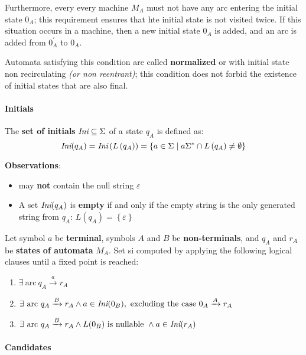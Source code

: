 \documentclass[english]{article}
\begin{document}
Furthermore, every every machine \(M_A\) must not have any arc entering the initial state \(0_A\); this requirement ensures that hte initial state is not visited twice.
If this situation occurs in a machine, then a new initial state \(0_A\) is added, and an arc is added from \(0^\prime_A\) to \(0_A\).

Automata satisfying this condition are called \textbf{normalized} or with initial state non recirculating \textit{(or non reentrant)};
this condition does not forbid the existence of initial states that are also final.

\paragraph{Initials}

The \textbf{set of initials} \(\textit{Ini} \subseteq \Sigma\) of a state \(q_A\) is defined as:
\[ \textit{Ini}(q_A) = \textit{Ini}\left( L\left( q_A \right) \right) = \left\{ a \in \Sigma \mid a \Sigma^\ast \cap L\left( q_A \right) \neq \emptyset \right\} \]

\bigskip
\textbf{Observations}:
\begin{itemize}
  \item \Ini may \textbf{not} contain the null string \(\varepsilon\)
  \item A set \(\textit{Ini}(q_A)\) is \textbf{empty} if and only if the empty string is the only generated string from \(q_A\): \(L\left( q_A \right) = \left\{ \varepsilon \right\}\)
\end{itemize}

\bigskip
Let symbol \(a\) be \textbf{terminal}, symbols \(A\) and \(B\) be \textbf{non-terminals}, and \(q_A\) and \(r_A\) be \textbf{states of automata} \(M_A\).
Set \Ini si computed by applying the following logical clauses until a fixed point is reached:

\begin{enumerate}
  \item \(\exists \ \text{arc} \ q_A \xrightarrow{a} r_A\)
  \item \(\exists \ \text{arc} \ q_A \xrightarrow{B} r_A \land a \in \Ini(0_B), \ \text{excluding the case} \ 0_A \xrightarrow{A} r_A\)
  \item \(\exists \ \text{arc} \ q_A \xrightarrow{B} r_A \land L(0_B) \ \text{is nullable} \ \land a \in \textit{Ini}(r_A)\)
\end{enumerate}

\paragraph{Candidates}
\label{par:candidates}
\end{document}
